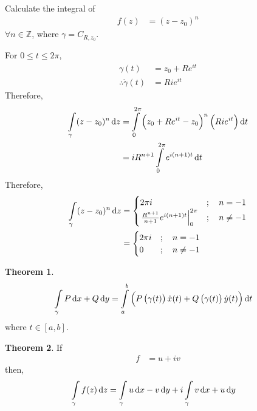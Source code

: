 \documentclass[titlepage, fleqn, a4paper, 12pt, twoside]{article}
\theoremstyle{definition}
\theoremstyle{theorem}
\newtheorem{theorem}{Theorem}
\begin{document}
\begin{question}
	Calculate the integral of
	\begin{align*}
		f(z) & = (z - z_0)^n
	\end{align*}
	$\forall n \in \mathbb{Z}$, where $\gamma = C_{R,z_0}$.
\end{question}

\begin{solution}
	For $0 \le t \le 2 \pi$,
	\begin{align*}
		\gamma(t)                  & = z_0 + R e^{i t} \\
		\therefore \dot{\gamma}(t) & = R i e^{i t}
	\end{align*}
	Therefore,
	\begin{align*}
		\int\limits_{\gamma} (z - z_0)^n \dif z & = \int\limits_{0}^{2 \pi} \left( z_0 + R e^{i t} - z_0 \right)^n \left( R i e^{i t} \right) \dif t \\
                                                        & = i R^{n + 1} \int\limits_{0}^{2 \pi} e^{i (n + 1) t} \dif t
	\end{align*}
	Therefore,
	\begin{align*}
		\int\limits_{\gamma} (z - z_0)^n \dif z &=
			\begin{cases}
				2 \pi i                                                            & ;\quad n = -1    \\
				\left. \frac{R^{n + 1}}{n + 1} e^{i (n + 1) t} \right|_{0}^{2 \pi} & ;\quad n \neq -1 \\
			\end{cases}\\
		&=
			\begin{cases}
				2 \pi i & ;\quad n = -1    \\
				0       & ;\quad n \neq -1 \\
			\end{cases}
	\end{align*}
\end{solution}

\begin{theorem}
	\begin{align*}
		\int\limits_{\gamma} P \dif x + Q \dif y & = \int\limits_{a}^{b} \left( P\left( \gamma(t) \right) \dot{x}(t) + Q\left( \gamma(t) \right) \dot{y}(t) \right) \dif t
	\end{align*}
	where $t \in [a,b]$.
\end{theorem}

\begin{theorem}
	If
	\begin{align*}
		f & = u + i v
	\end{align*}
	then,
	\begin{align*}
		\int\limits_{\gamma} f(z) \dif z & = \int\limits_{\gamma} u \dif x - v \dif y + i \int\limits_{\gamma} v \dif x + u \dif y
	\end{align*}
\end{theorem}
\end{document}
